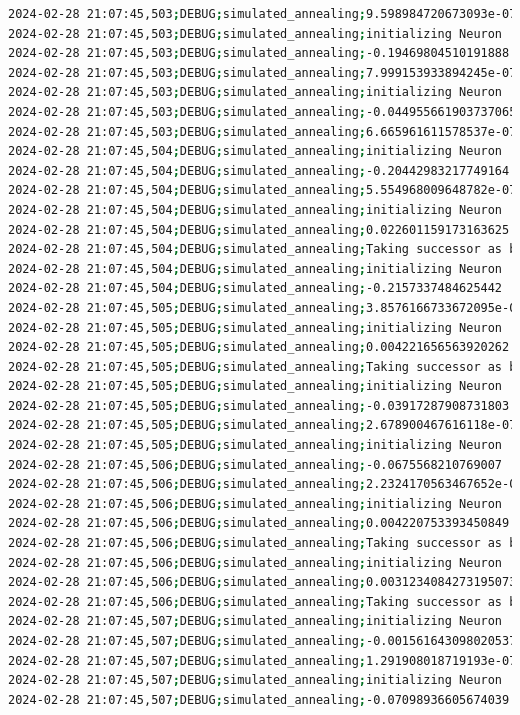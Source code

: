 \documentclass{article}
\begin{document}
\begin{lstlisting}[language=bash, caption=Example Output of Program]
2024-02-28 21:07:45,503;DEBUG;simulated_annealing;9.598984720673093e-07
2024-02-28 21:07:45,503;DEBUG;simulated_annealing;initializing Neuron
2024-02-28 21:07:45,503;DEBUG;simulated_annealing;-0.19469804510191888
2024-02-28 21:07:45,503;DEBUG;simulated_annealing;7.999153933894245e-07
2024-02-28 21:07:45,503;DEBUG;simulated_annealing;initializing Neuron
2024-02-28 21:07:45,503;DEBUG;simulated_annealing;-0.044955661903737065
2024-02-28 21:07:45,503;DEBUG;simulated_annealing;6.665961611578537e-07
2024-02-28 21:07:45,504;DEBUG;simulated_annealing;initializing Neuron
2024-02-28 21:07:45,504;DEBUG;simulated_annealing;-0.20442983217749164
2024-02-28 21:07:45,504;DEBUG;simulated_annealing;5.554968009648782e-07
2024-02-28 21:07:45,504;DEBUG;simulated_annealing;initializing Neuron
2024-02-28 21:07:45,504;DEBUG;simulated_annealing;0.022601159173163625
2024-02-28 21:07:45,504;DEBUG;simulated_annealing;Taking successor as better option (exploitation)
2024-02-28 21:07:45,504;DEBUG;simulated_annealing;initializing Neuron
2024-02-28 21:07:45,504;DEBUG;simulated_annealing;-0.2157337484625442
2024-02-28 21:07:45,505;DEBUG;simulated_annealing;3.8576166733672095e-07
2024-02-28 21:07:45,505;DEBUG;simulated_annealing;initializing Neuron
2024-02-28 21:07:45,505;DEBUG;simulated_annealing;0.004221656563920262
2024-02-28 21:07:45,505;DEBUG;simulated_annealing;Taking successor as better option (exploitation)
2024-02-28 21:07:45,505;DEBUG;simulated_annealing;initializing Neuron
2024-02-28 21:07:45,505;DEBUG;simulated_annealing;-0.03917287908731803
2024-02-28 21:07:45,505;DEBUG;simulated_annealing;2.678900467616118e-07
2024-02-28 21:07:45,505;DEBUG;simulated_annealing;initializing Neuron
2024-02-28 21:07:45,506;DEBUG;simulated_annealing;-0.0675568210769007
2024-02-28 21:07:45,506;DEBUG;simulated_annealing;2.2324170563467652e-07
2024-02-28 21:07:45,506;DEBUG;simulated_annealing;initializing Neuron
2024-02-28 21:07:45,506;DEBUG;simulated_annealing;0.004220753393450849
2024-02-28 21:07:45,506;DEBUG;simulated_annealing;Taking successor as better option (exploitation)
2024-02-28 21:07:45,506;DEBUG;simulated_annealing;initializing Neuron
2024-02-28 21:07:45,506;DEBUG;simulated_annealing;0.0031234084273195073
2024-02-28 21:07:45,506;DEBUG;simulated_annealing;Taking successor as better option (exploitation)
2024-02-28 21:07:45,507;DEBUG;simulated_annealing;initializing Neuron
2024-02-28 21:07:45,507;DEBUG;simulated_annealing;-0.0015616430980205376
2024-02-28 21:07:45,507;DEBUG;simulated_annealing;1.291908018719193e-07
2024-02-28 21:07:45,507;DEBUG;simulated_annealing;initializing Neuron
2024-02-28 21:07:45,507;DEBUG;simulated_annealing;-0.07098936605674039

\end{lstlisting}
\end{document}
